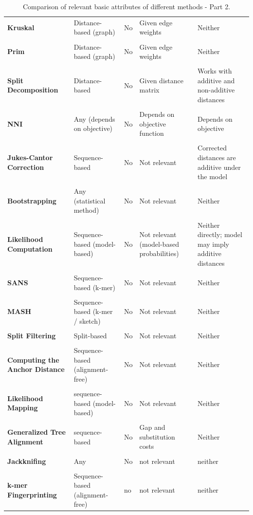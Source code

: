 \begin{table}[H]
    \centering
    \begin{tabular}{p{3.5cm}p{3cm}p{2cm}p{3cm}p{3cm}}
\textbf{Kruskal} & Distance-based (graph) & No & Given edge weights & Neither \\ \\
    \textbf{Prim} & Distance-based (graph) & No & Given edge weights & Neither \\ \\
\textbf{Split Decomposition} & \textcolor{amethyst}{Distance-based} & No & \textcolor{amethyst}{Given distance matrix} & Works with additive and non-additive distances \\ \\
\textbf{NNI} & Any (depends on objective) & No & Depends on objective function & Depends on objective \\ \\
\textbf{Jukes-Cantor Correction} & Sequence-based & No & Not relevant & Corrected distances are additive under the model \\ \\
\textbf{Bootstrapping} & Any (statistical method) & No & Not relevant & Neither \\ \\
\textbf{Likelihood Computation} & Sequence-based (model-based) & No & Not relevant (model-based probabilities) & Neither directly; model may imply additive distances \\ \\
\textbf{SANS} & Sequence-based (k-mer) & No & Not relevant & Neither \\ \\
\textbf{MASH} & Sequence-based (k-mer / sketch) & No & Not relevant & Neither \\ \\
\textbf{Split Filtering} & Split-based & No & Not relevant & Neither \\ \\
\textbf{Computing the Anchor Distance} & Sequence-based (alignment-free) & No & Not relevant & Neither \\ \\
\textbf{Likelihood Mapping} & sequence-based (model-based) & No & Not relevant & Neither \\ \\
\textbf{Generalized Tree Alignment} & sequence-based & No & Gap and substitution costs & Neither  \\ \\
\textbf{Jackknifing} & Any &  No & not relevant & neither  \\ \\
\textbf{k-mer Fingerprinting} & Sequence-based (alignment-free) & no & not relevant & neither 
    \end{tabular}

 \caption{Comparison of relevant basic attributes of different methods - Part 2.}
\end{table}

